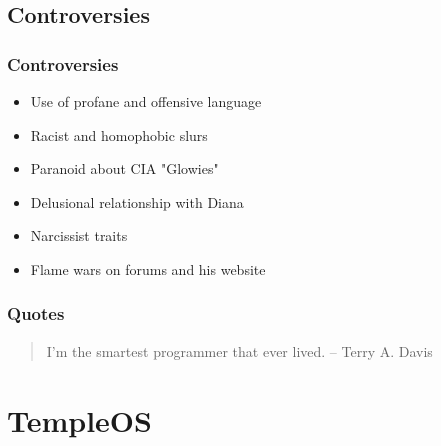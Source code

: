 \documentclass{beamer}
\begin{document}
	\subsection{Controversies}
	\begin{frame}
		\frametitle{Controversies}
		\begin{itemize}
			\item Use of profane and offensive language

			\item Racist and homophobic slurs

			\item Paranoid about CIA "Glowies"

			\item Delusional relationship with Diana

			\item Narcissist traits

			\item Flame wars on forums and his website
		\end{itemize}

		\vspace{1em}
		\frametitle{Quotes}
		\begin{quote}
			I'm the smartest programmer that ever lived. \flushright -- Terry A. Davis
		\end{quote}
	\end{frame}

	\section[TOS]{TempleOS}
\end{document}
